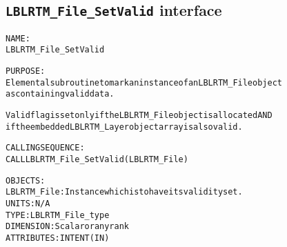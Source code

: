 \subsection{\texttt{LBLRTM\_File\_SetValid} interface}
  \label{sec:LBLRTM_File_SetValid_interface}
  \begin{alltt}
 
  NAME:
        LBLRTM_File_SetValid
 
  PURPOSE:
        Elemental subroutine to mark an instance of an LBLRTM_File object
        as containing valid data.
 
        Valid flag is set only if the LBLRTM_File object is allocated AND
        if the embedded LBLRTM_Layer object array is also valid.
 
  CALLING SEQUENCE:
        CALL LBLRTM_File_SetValid( LBLRTM_File )
 
  OBJECTS:
        LBLRTM_File:   Instance which is to have its validity set.
                       UNITS:      N/A
                       TYPE:       LBLRTM_File_type
                       DIMENSION:  Scalar or any rank
                       ATTRIBUTES: INTENT(IN)
 
  \end{alltt}
